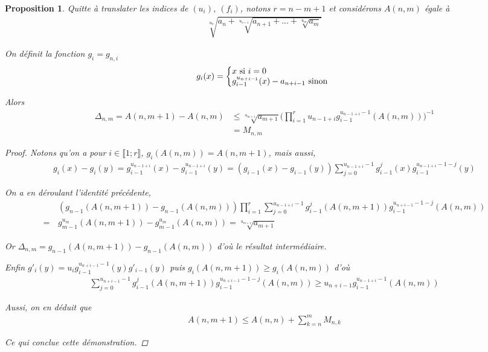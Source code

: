 \documentclass{article}
\newtheorem{prop}{Proposition}
\begin{document}
\begin{prop}
Quitte à translater les indices de $(u_i)$, $(f_i)$, notons $r = n-m+1$ et considérons $A(n,m)$ égale à 
\begin{align*}
\sqrt[u_n]{a_{n}+\sqrt[u_{n+1}]{a_{n+1}+...+\sqrt[u_{m}]{a_{m}}}}
\end{align*}

On définit la fonction $g_i=g_{n,i}$
\begin{align*}
g_{i}(x)=\left\{
     \begin{array}{@{}l@{\thinspace}l}
    x \textup{ si } i = 0\\
    g^{u_{n+i-1}}_{i-1}(x)-a_{n+i-1} \textup{ sinon }
     \end{array}
   \right.   
\end{align*}

Alors
\begin{align*}
\Delta_{n,m} = A(n,m+1)-A(n,m)&\leq \sqrt[u_{m+1}]{a_{m+1}}\bigg(\prod_{i=1}^{r} u_{n-1+i} g^{u_{n-1+i}-1}_{i-1}(A(n,m))\bigg)^{-1}\\
&=M_{n,m}
\end{align*}
\begin{proof}
Notons qu'on a pour $i\in\llbracket 1;r\rrbracket$, $g_{i}(A(n,m))=A(n,m+1)$, mais aussi, 
\begin{align*}
g_{i}(x)-g_{i}(y)=g^{u_{n-1+i}}_{i-1}(x)-g^{u_{n-1+i}}_{i-1}(y)=(g_{i-1}(x)-g_{i-1}(y))\sum_{j=0}^{u_{n-1+i}-1}{g_{i-1}^j(x)g_{i-1}^{u_{n-1+i}-1-j}(y)}
\end{align*}

On a en déroulant l'identité précédente,
\begin{align*}
&(g_{n-1}(A(n,m+1))-g_{n-1}(A(n,m)))\prod_{i=1}^{r}\sum_{j=0}^{u_{n-1+i}-1}g^{j}_{i-1}(A(n,m+1))g^{u_{n+i-1}-1-j}_{i-1}(A(n,m))\\
=\,&g^{u_m}_{m-1}(A(n,m+1))-g^{u_m}_{m-1}(A(n,m))=\sqrt[u_{m+1}]{a_{m+1}}
\end{align*}

Or $\Delta_{n,m}=g_{n-1}(A(n,m+1))-g_{n-1}(A(n,m))$ d'où le résultat intermédiaire.

Enfin $g'_{i}(y)=u_ig^{u_{n+i-1}-1}_{i-1}(y)g'_{i-1}(y)$ puis $g_{i}(A(n,m+1))\geq g_{i}(A(n,m))$ d'où
\begin{align*}
\sum_{j=0}^{u_{n+i-1}-1}g^{j}_{i-1}(A(n,m+1))g^{u_{n+i-1}-1-j}_{i-1}(A(n,m))\geq u_{n+i-1} g^{u_{n-1+i}-1}_{i-1}(A(n,m))
\end{align*}

Aussi, on en déduit que 
\begin{align*}
A(n,m+1)\leq A(n,n)+ \sum_{k = n}^m M_{n,k}
\end{align*}

Ce qui conclue cette démonstration.
\end{proof}
\end{prop}
\end{document}
